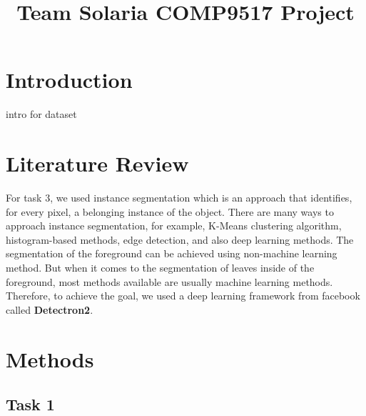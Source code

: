 \documentclass[conference]{IEEEtran}
\begin{document}
%
\title{Team Solaria COMP9517 Project}


\author{
\and
{}
\IEEEauthorblockA{}
\and
{}
}


\maketitle
\IEEEpeerreviewmaketitle



\section{Introduction}
intro for dataset


\section{Literature Review}

For task 3, we used instance segmentation \cite{Hafiz_2020} which is an approach that identifies, for every pixel, a belonging instance of the object.
There are many ways to approach instance segmentation, for example, K-Means clustering algorithm, histogram-based methods, edge detection, and also deep learning methods. The segmentation of the foreground can be achieved using non-machine learning method. But when it comes to the segmentation of leaves inside of the foreground, most methods available are usually machine learning methods. Therefore, to achieve the goal, we used a deep learning framework from facebook called  \textbf{Detectron2}. 

\section{Methods}

\subsection{Task 1}
\end{document}

